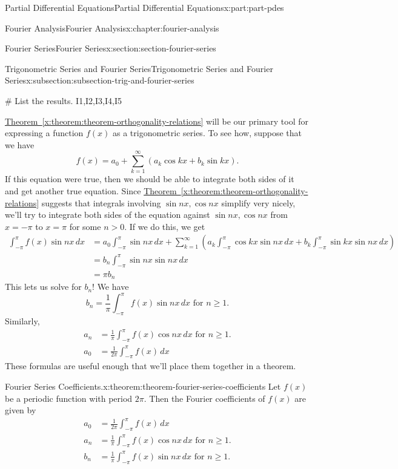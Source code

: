 \documentclass[twoside,10pt,]{book}
\newcommand{\xreffont}{\relax}
\numberwithin{equation}{part}
\newcommand{\amp}{&}
\begin{document}
\begin{partptx}{Partial Differential Equations}{}{Partial Differential Equations}{}{}{x:part:part-pdes}
\begin{chapterptx}{Fourier Analysis}{}{Fourier Analysis}{}{}{x:chapter:fourier-analysis}
\begin{sectionptx}{Fourier Series}{}{Fourier Series}{}{}{x:section:section-fourier-series}
\begin{subsectionptx}{Trigonometric Series and Fourier Series}{}{Trigonometric Series and Fourier Series}{}{}{x:subsection:subsection-trig-and-fourier-series}
\begin{sageinput}
# List the results.
I1,I2,I3,I4,I5
\end{sageinput}
\hyperref[x:theorem:theorem-orthogonality-relations]{Theorem~{\xreffont\ref{x:theorem:theorem-orthogonality-relations}}} will be our primary tool for expressing a function \(f(x)\) as a trigonometric series. To see how, suppose that we have%
\begin{equation*}
f(x) = a_{0} + \sum_{k=1}^{\infty}(a_{k}\cos kx+b_{k}\sin kx).
\end{equation*}
If this equation were true, then we should be able to integrate both sides of it and get another true equation. Since \hyperref[x:theorem:theorem-orthogonality-relations]{Theorem~{\xreffont\ref{x:theorem:theorem-orthogonality-relations}}} suggests that integrals involving \(\sin nx,\cos nx\) simplify very nicely, we'll try to integrate both sides of the equation against \(\sin nx,\cos nx\) from \(x=-\pi\) to \(x=\pi\) for some \(n>0\). If we do this, we get%
\begin{align*}
\int_{-\pi}^{\pi}f(x)\sin nx\,dx \amp = a_{0}\int_{-\pi}^{\pi}\sin nx\,dx + \sum_{k=1}^{\infty}\left(a_{k}\int_{-\pi}^{\pi}\cos kx\sin nx\,dx + b_{k}\int_{-\pi}^{\pi}\sin kx\sin nx\,dx\right)\\
\amp = b_{n}\int_{-\pi}^{\pi}\sin nx \sin nx \,dx\\
\amp = \pi b_{n}
\end{align*}
This lets us solve for \(b_{n}\)! We have%
\begin{equation*}
b_{n} = \frac{1}{\pi}\int_{-\pi}^{\pi}f(x)\sin nx\,dx\text{ for $n\geq 1$.}
\end{equation*}
Similarly,%
\begin{align*}
a_{n} \amp = \frac{1}{\pi}\int_{-\pi}^{\pi}f(x)\cos nx\,dx\text{ for $n\geq1$.}\\
a_{0} \amp = \frac{1}{2\pi}\int_{-\pi}^{\pi}f(x)\,dx
\end{align*}
These formulas are useful enough that we'll place them together in a theorem.%
\begin{theorem}{Fourier Series Coefficients.}{}{x:theorem:theorem-fourier-series-coefficients}%
%
Let \(f(x)\) be a periodic function with period \(2\pi\). Then the Fourier coefficients of \(f(x)\) are given by%
\begin{align*}
a_{0} \amp= \frac{1}{2\pi}\int_{-\pi}^{\pi}f(x)\,dx\\
a_{n} \amp = \frac{1}{\pi}\int_{-\pi}^{\pi}f(x)\cos nx\,dx\text{ for $n\geq1$.}\\
b_{n} \amp= \frac{1}{\pi}\int_{-\pi}^{\pi}f(x)\sin nx\,dx\text{ for $n\geq 1$.}

\end{align*}
\end{theorem}
\end{subsectionptx}
\end{sectionptx}
\end{chapterptx}
\end{partptx}
\end{document}
